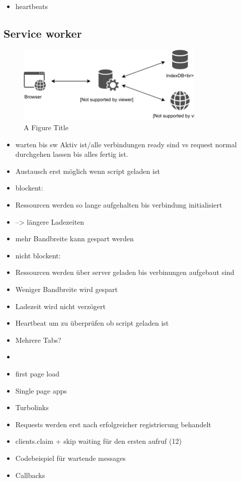 \begin{itemize}
	\item heartbeats
\end{itemize}

\subsection{Service worker}

\begin{figure}[!h]
	\centering
	\includegraphics[width=0.8\textwidth]{figures/ServiceWorker}
	\caption[A Figure Short-Title]{A Figure Title}
	\label{fig:sequenceDiagram}
\end{figure}
\begin{itemize}
  \item warten bis sw Aktiv ist/alle verbindungen ready sind vs request normal durchgehen lassen bis alles fertig ist.
  \item 	Austausch erst möglich wenn script geladen ist
  \item 	blockent: 
  \item 		Ressourcen werden so lange aufgehalten bis verbindung initialisiert
  \item 		--> längere Ladezeiten
  \item 		mehr Bandbreite kann gespart werden
  \item 	nicht blockent: 
  \item 		Ressourcen werden über server geladen bis verbinungen aufgebaut sind
  \item 		Weniger Bandbreite wird gespart
  \item 		Ladezeit wird nicht verzögert
  \item 		Heartbeat um zu überprüfen ob script geladen ist
  \item Mehrere Tabs?
  \item 		
  \item first page load
  \item Single page apps
  \item Turbolinks
  \item Requests werden erst nach erfolgreicher registrierung behandelt
  \item clients.claim + skip waiting für den ersten aufruf (12)
  \item Codebeispiel für wartende messages
  \item 	Callbacks
\end{itemize}

